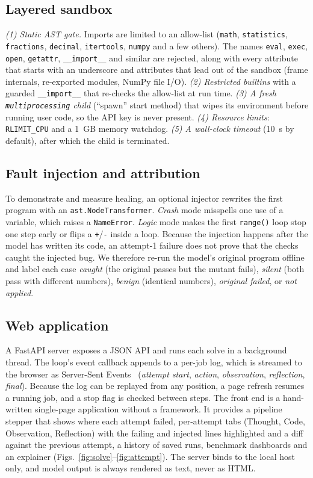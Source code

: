 \documentclass[conference]{IEEEtran}
\begin{document}
\subsection{Layered sandbox}
\emph{(1) Static AST gate.} Imports are limited to an allow-list (\texttt{math}, \texttt{statistics}, \texttt{fractions}, \texttt{decimal}, \texttt{itertools}, \texttt{numpy} and a few others). The names \texttt{eval}, \texttt{exec}, \texttt{open}, \texttt{getattr}, \texttt{\_\_import\_\_} and similar are rejected, along with every attribute that starts with an underscore and attributes that lead out of the sandbox (frame internals, re-exported modules, NumPy file I/O). \emph{(2) Restricted builtins} with a guarded \texttt{\_\_import\_\_} that re-checks the allow-list at run time. \emph{(3) A fresh \texttt{multiprocessing} child} (``spawn'' start method) that wipes its environment before running user code, so the API key is never present. \emph{(4) Resource limits}: \texttt{RLIMIT\_CPU} and a 1~GB memory watchdog. \emph{(5) A wall-clock timeout} (10~s by default), after which the child is terminated.

\subsection{Fault injection and attribution}
To demonstrate and measure healing, an optional injector rewrites the first program with an \texttt{ast.NodeTransformer}. \emph{Crash} mode misspells one use of a variable, which raises a \texttt{NameError}. \emph{Logic} mode makes the first \texttt{range()} loop stop one step early or flips a \texttt{+}/\texttt{-} inside a loop. Because the injection happens after the model has written its code, an attempt-1 failure does not prove that the checks caught the injected bug. We therefore re-run the model's original program offline and label each case \emph{caught} (the original passes but the mutant fails), \emph{silent} (both pass with different numbers), \emph{benign} (identical numbers), \emph{original failed}, or \emph{not applied}.

\subsection{Web application}
A FastAPI server exposes a JSON API and runs each solve in a background thread. The loop's event callback appends to a per-job log, which is streamed to the browser as Server-Sent Events~\cite{whatwgsse} (\emph{attempt start}, \emph{action}, \emph{observation}, \emph{reflection}, \emph{final}). Because the log can be replayed from any position, a page refresh resumes a running job, and a stop flag is checked between steps. The front end is a hand-written single-page application without a framework. It provides a pipeline stepper that shows where each attempt failed, per-attempt tabs (Thought, Code, Observation, Reflection) with the failing and injected lines highlighted and a diff against the previous attempt, a history of saved runs, benchmark dashboards and an explainer (Figs.~\ref{fig:solve}--\ref{fig:attempt}). The server binds to the local host only, and model output is always rendered as text, never as HTML.
\end{document}
